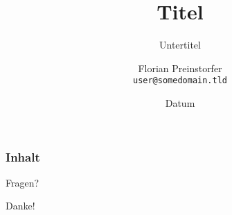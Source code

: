 \documentclass[%
]{beamer}
\title{Titel}
\subtitle{Untertitel}
\author[Florian Preinstorfer]{Florian Preinstorfer\\
  \small{\texttt{user@somedomain.tld}}
}
\date[Ort - Datum]{Datum}
\begin{document}
\frame[plain]{\titlepage}

\begin{frame}
  \frametitle{Inhalt}
  \tableofcontents
\end{frame}


\begin{frame}[plain]
  \begin{center}
  Fragen?

  Danke!
  \end{center}
\end{frame}
\end{document}
